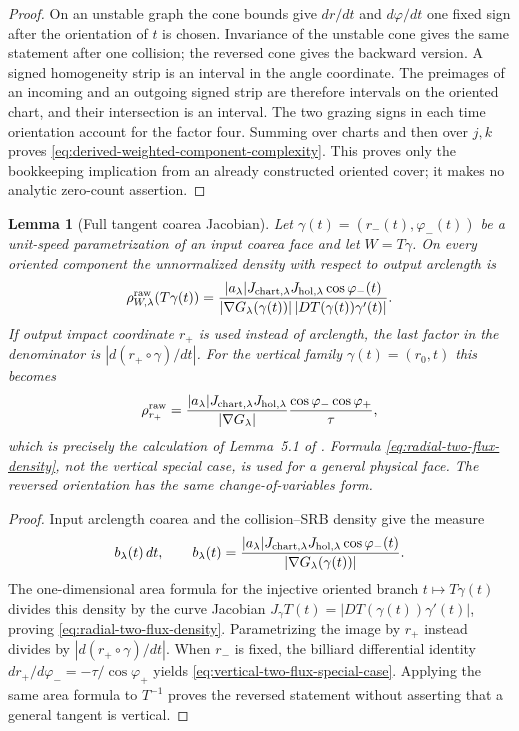 \documentclass[11pt]{article}
\newtheorem{lemma}[theorem]{Lemma}
\begin{document}
\begin{proof}
On an unstable graph the cone bounds give $dr/dt$ and $d\varphi/dt$ one fixed
sign after the orientation of $t$ is chosen.  Invariance of the unstable cone
gives the same statement after one collision; the reversed cone gives the
backward version.  A signed homogeneity strip is an interval in the angle
coordinate.  The preimages of an incoming and an outgoing signed strip are
therefore intervals on the oriented chart, and their intersection is an
interval.  The two grazing signs in each time orientation account for the
factor four.  Summing over charts and then over $j,k$ proves
\eqref{eq:derived-weighted-component-complexity}.  This proves only the
bookkeeping implication from an already constructed oriented cover; it makes
no analytic zero-count assertion.
\end{proof}

\begin{lemma}[Full tangent coarea Jacobian]
\label{lem:two-flux-coarea}
Let $\gamma(t)=(r_-(t),\varphi_-(t))$ be a unit-speed parametrization of an
input coarea face and let $W=T\gamma$.  On every oriented component the
unnormalized density with respect to output arclength is
\begin{equation}
\label{eq:radial-two-flux-density}
 \rho^{\rm raw}_{W,\lambda}(T\gamma(t))=
 \frac{|a_\lambda|J_{{\rm chart},\lambda}J_{{\rm hol},\lambda}
       \cos\varphi_-(t)}
 {|\nabla G_\lambda(\gamma(t))|\,
       |D T(\gamma(t))\gamma'(t)|}.
\end{equation}
If output impact coordinate $r_+$ is used instead of arclength, the last
factor in the denominator is $|d(r_+\circ\gamma)/dt|$.  For the vertical
family $\gamma(t)=(r_0,t)$ this becomes
\begin{equation}
\label{eq:vertical-two-flux-special-case}
 \rho^{\rm raw}_{r_+}=
 \frac{|a_\lambda|J_{{\rm chart},\lambda}J_{{\rm hol},\lambda}}
 {|\nabla G_\lambda|}\frac{\cos\varphi_-\cos\varphi_+}{\tau},
\end{equation}
which is precisely the calculation of Lemma~5.1 of
\cite{CanestrariHoles}.  Formula \eqref{eq:radial-two-flux-density}, not the
vertical special case, is used for a general physical face.  The reversed
orientation has the same change-of-variables form.
\end{lemma}

\begin{proof}
Input arclength coarea and the collision--SRB density give the measure
\[
 b_\lambda(t)\,dt,
 \qquad b_\lambda(t)=
 \frac{|a_\lambda|J_{{\rm chart},\lambda}J_{{\rm hol},\lambda}
       \cos\varphi_-(t)}{|\nabla G_\lambda(\gamma(t))|}.
\]
The one-dimensional area formula for the injective oriented branch
$t\mapsto T\gamma(t)$ divides this density by the curve Jacobian
$J_\gamma T(t)=|DT(\gamma(t))\gamma'(t)|$, proving
\eqref{eq:radial-two-flux-density}.  Parametrizing the image by $r_+$ instead
divides by $|d(r_+\circ\gamma)/dt|$.  When $r_-$ is fixed, the billiard
differential identity
$dr_+/d\varphi_-=-\tau/\cos\varphi_+$ yields
\eqref{eq:vertical-two-flux-special-case}.  Applying the same area formula to
$T^{-1}$ proves the reversed statement without asserting that a general
tangent is vertical.
\end{proof}
\end{document}
